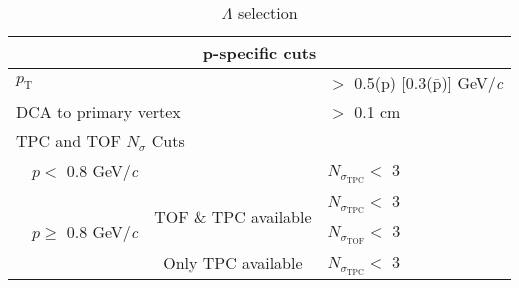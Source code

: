 \documentclass[ALICE,manyauthors]{cernphprep}
\newcommand{\Lam}{$\Lambda$\xspace}
\begin{document}
\begin{table}[htbp]
\begin{tabular}{lc|c|l}
   
   \multicolumn{4}{c}{\textbf{p-specific cuts}} \\
   \hline
   \multicolumn{3}{l|}{$p_{\mathrm{T}}$} & $ > $ 0.5(p) [0.3($\bar{\mathrm{p}}$)] GeV/\textit{c} \\
   \hline
   \multicolumn{3}{l|}{DCA to primary vertex} & $>$ 0.1 cm \\
   \hline
   \multicolumn{4}{l}{TPC and TOF $N_{\sigma}$ Cuts} \\
   \cline{2-4}
    & \multicolumn{1}{c}{$p <$ 0.8 GeV/\textit{c}} & & $N_{\sigma_{\mathrm{TPC}}} <$ 3 \\
   \cline{2-4}
    & \multicolumn{1}{c}{\multirow{3}{*}{$p \geq$ 0.8 GeV/\textit{c}}} &  \multirow{2}{*}{TOF \& TPC available} & $N_{\sigma_{\mathrm{TPC}}} <$ 3 \\
    & \multicolumn{2}{c|}{} & $N_{\sigma_{\mathrm{TOF}}} <$ 3 \\
   \cline{3-4}
    & \multicolumn{1}{c}{} & Only TPC available & $N_{\sigma_{\mathrm{TPC}}} <$ 3 \\
   \hline   
  \end{tabular}
 \caption{\Lam selection}
 \label{tab:LamCuts} 
\end{table}
\end{document}
